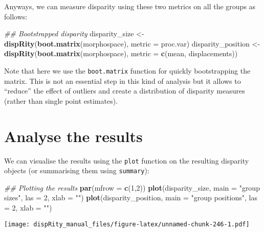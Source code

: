 \documentclass[
]{book}
\newenvironment{Shaded}{\begin{snugshade}}{\end{snugshade}}
\newcommand{\CommentTok}[1]{\textcolor[rgb]{0.56,0.35,0.01}{\textit{#1}}}
\newcommand{\DataTypeTok}[1]{\textcolor[rgb]{0.13,0.29,0.53}{#1}}
\newcommand{\DecValTok}[1]{\textcolor[rgb]{0.00,0.00,0.81}{#1}}
\newcommand{\KeywordTok}[1]{\textcolor[rgb]{0.13,0.29,0.53}{\textbf{#1}}}
\newcommand{\NormalTok}[1]{#1}
\newcommand{\StringTok}[1]{\textcolor[rgb]{0.31,0.60,0.02}{#1}}
\begin{document}
Anyways, we can measure disparity using these two metrics on all the groups as follows:

\begin{Shaded}
\begin{Highlighting}[]
\CommentTok{\#\# Bootstrapped disparity}
\NormalTok{disparity\_size \textless{}{-}}\StringTok{  }\KeywordTok{dispRity}\NormalTok{(}\KeywordTok{boot.matrix}\NormalTok{(morphospace), }\DataTypeTok{metric =}\NormalTok{ proc.var)}
\NormalTok{disparity\_position \textless{}{-}}\StringTok{ }\KeywordTok{dispRity}\NormalTok{(}\KeywordTok{boot.matrix}\NormalTok{(morphospace), }\DataTypeTok{metric =} \KeywordTok{c}\NormalTok{(mean, displacements))}
\end{Highlighting}
\end{Shaded}

Note that here we use the \texttt{boot.matrix} function for quickly bootstrapping the matrix.
This is not an essential step in this kind of analysis but it allows to ``reduce'' the effect of outliers and create a distribution of disparity measures (rather than single point estimates).

\hypertarget{analyse-the-results}{%
\section{Analyse the results}\label{analyse-the-results}}

We can visualise the results using the \texttt{plot} function on the resulting disparity objects (or summarising them using \texttt{summary}):

\begin{Shaded}
\begin{Highlighting}[]
\CommentTok{\#\# Plotting the results}
\KeywordTok{par}\NormalTok{(}\DataTypeTok{mfrow =} \KeywordTok{c}\NormalTok{(}\DecValTok{1}\NormalTok{,}\DecValTok{2}\NormalTok{))}
\KeywordTok{plot}\NormalTok{(disparity\_size, }\DataTypeTok{main =} \StringTok{"group sizes"}\NormalTok{, }\DataTypeTok{las =} \DecValTok{2}\NormalTok{, }\DataTypeTok{xlab =} \StringTok{""}\NormalTok{)}
\KeywordTok{plot}\NormalTok{(disparity\_position, }\DataTypeTok{main =} \StringTok{"group positions"}\NormalTok{, }\DataTypeTok{las =} \DecValTok{2}\NormalTok{, }\DataTypeTok{xlab =} \StringTok{""}\NormalTok{)}
\end{Highlighting}
\end{Shaded}

\texttt{[image: dispRity\_manual\_files/figure-latex/unnamed-chunk-246-1.pdf]}
\end{document}
